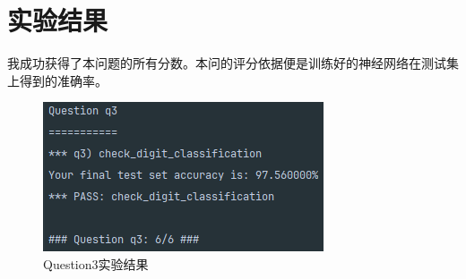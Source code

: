 \section{实验结果}
我成功获得了本问题的所有分数。本问的评分依据便是训练好的神经网络在测试集上得到的准确率。
\begin{figure}[htbp]
    \centering
    \includegraphics{pic/q3.png}
    \caption{Question3实验结果}\label{q3}
\end{figure}
%
%
